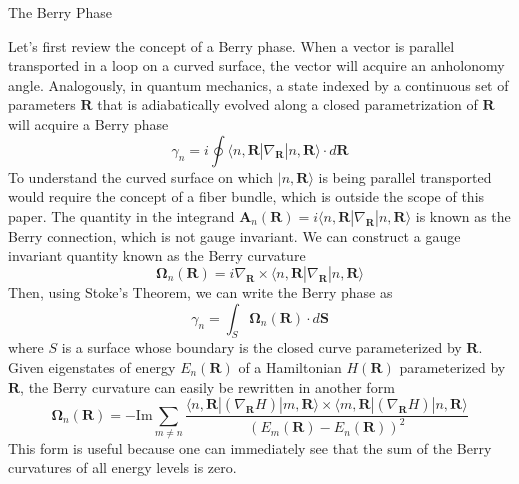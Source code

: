 \documentclass[a4paper,12pt]{article}
\renewcommand{\vec}[1]{\boldsymbol{\mathbf{#1}}}
\begin{document}
\begin{section}{The Berry Phase}

Let's first review the concept of a Berry phase.  When a vector is parallel transported in a loop on a curved surface, the vector will acquire an anholonomy angle.  Analogously, in quantum mechanics, a state indexed by a continuous set of parameters $\vec{R}$ that is adiabatically evolved along a closed parametrization of $\vec{R}$ will acquire a Berry phase \cite{griffiths}
\begin{equation}
\gamma_n=i \oint \langle n, \vec{R} | \nabla_{\vec{R}} | n, \vec{R} \rangle \cdot d\vec{R}
\end{equation}
To understand the curved surface on which $| n, \vec{R} \rangle$ is being parallel transported would require the concept of a fiber bundle, which is outside the scope of this paper.  The quantity in the integrand $\vec{A}_n(\vec{R})=i \langle n, \vec{R} | \nabla_{\vec{R}} | n, \vec{R} \rangle$ is known as the Berry connection, which is not gauge invariant.  We can construct a gauge invariant quantity known as the Berry curvature
\begin{equation}
\vec{\Omega}_n(\vec{R})=i \nabla_{\vec{R}} \times \langle n, \vec{R} | \nabla_{\vec{R}} | n, \vec{R} \rangle
\end{equation}
Then, using Stoke's Theorem, we can write the Berry phase as
\begin{equation}
\gamma_n=\int_S \vec{\Omega}_n(\vec{R}) \cdot d\vec{S}
\end{equation}
where $S$ is a surface whose boundary is the closed curve parameterized by $\vec{R}$.  Given eigenstates of energy $E_n(\vec{R})$ of a Hamiltonian $H(\vec{R})$ parameterized by $\vec{R}$, the Berry curvature can easily be rewritten in another form \cite{bernevig}
\begin{equation}\label{eq:curvature}
\vec{\Omega}_n(\vec{R})=- \text{Im} \sum_{m \ne n}{\frac{\langle n, \vec{R} | (\nabla_{\vec{R}} H) | m, \vec{R} \rangle \times \langle m, \vec{R} | (\nabla_{\vec{R}} H) | n, \vec{R} \rangle}{(E_m(\vec{R})-E_n(\vec{R}))^2}}
\end{equation}
This form is useful because one can immediately see that the sum of the Berry curvatures of all energy levels is zero.


\end{section}
\end{document}
